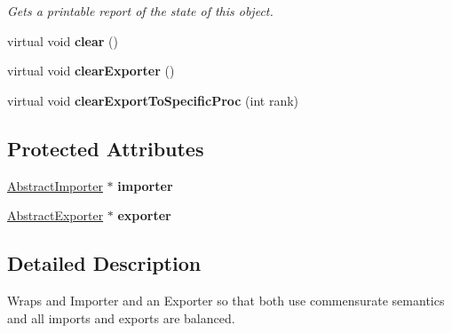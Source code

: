 \begin{DoxyCompactItemize}
\begin{DoxyCompactList}\small\item\em Gets a printable report of the state of this object. \end{DoxyCompactList}\item 
\hypertarget{classrepast_1_1_abstract_importer_exporter_ab57eba622eb30e4ba582e34ffc824e75}{virtual void {\bfseries clear} ()}\label{classrepast_1_1_abstract_importer_exporter_ab57eba622eb30e4ba582e34ffc824e75}

\item 
\hypertarget{classrepast_1_1_abstract_importer_exporter_a9354b5573205709463f3eedecc764545}{virtual void {\bfseries clear\-Exporter} ()}\label{classrepast_1_1_abstract_importer_exporter_a9354b5573205709463f3eedecc764545}

\item 
\hypertarget{classrepast_1_1_abstract_importer_exporter_ad5166b403fde572938f4785b6609b59d}{virtual void {\bfseries clear\-Export\-To\-Specific\-Proc} (int rank)}\label{classrepast_1_1_abstract_importer_exporter_ad5166b403fde572938f4785b6609b59d}

\end{DoxyCompactItemize}
\subsection*{Protected Attributes}
\begin{DoxyCompactItemize}
\item 
\hypertarget{classrepast_1_1_abstract_importer_exporter_ad987855240b21c39cdfb0f0ffc2b4af1}{\hyperlink{classrepast_1_1_abstract_importer}{Abstract\-Importer} $\ast$ {\bfseries importer}}\label{classrepast_1_1_abstract_importer_exporter_ad987855240b21c39cdfb0f0ffc2b4af1}

\item 
\hypertarget{classrepast_1_1_abstract_importer_exporter_a3090b10b2021c25aeb73c879b0979b75}{\hyperlink{classrepast_1_1_abstract_exporter}{Abstract\-Exporter} $\ast$ {\bfseries exporter}}\label{classrepast_1_1_abstract_importer_exporter_a3090b10b2021c25aeb73c879b0979b75}

\end{DoxyCompactItemize}


\subsection{Detailed Description}
Wraps and Importer and an Exporter so that both use commensurate semantics and all imports and exports are balanced. 

